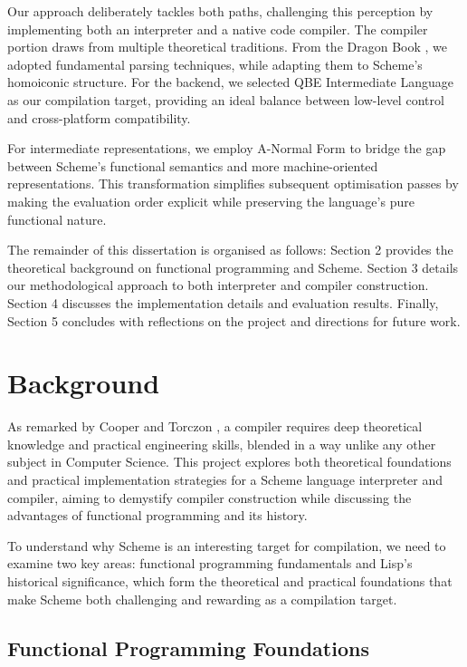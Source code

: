 \documentclass[final]{cmpreport_02}
\begin{document}
Our approach deliberately tackles both paths, challenging this perception by implementing both an interpreter and a native code compiler. The compiler portion draws from multiple theoretical traditions. From the Dragon Book \cite{aho2006compilers}, we adopted fundamental parsing techniques, while adapting them to Scheme's homoiconic structure. For the backend, we selected QBE Intermediate Language \cite{qbe_il} as our compilation target, providing an ideal balance between low-level control and cross-platform compatibility.

For intermediate representations, we employ A-Normal Form \cite{flanagan1993essence} to bridge the gap between Scheme's functional semantics and more machine-oriented representations. This transformation simplifies subsequent optimisation passes by making the evaluation order explicit while preserving the language's pure functional nature.

The remainder of this dissertation is organised as follows: Section 2 provides the theoretical background on functional programming and Scheme. Section 3 details our methodological approach to both interpreter and compiler construction. Section 4 discusses the implementation details and evaluation results. Finally, Section 5 concludes with reflections on the project and directions for future work.

\section{Background}

As remarked by Cooper and Torczon \cite{cooper2011engineering}, a compiler requires deep theoretical knowledge and practical engineering skills, blended in a way unlike any other subject in Computer Science. This project explores both theoretical foundations and practical implementation strategies for a Scheme language interpreter and compiler, aiming to demystify compiler construction while discussing the advantages of functional programming and its history.

To understand why Scheme is an interesting target for compilation, we need to examine two key areas: functional programming fundamentals and Lisp's historical significance, which form the theoretical and practical foundations that make Scheme both challenging and rewarding as a compilation target.

\subsection{Functional Programming Foundations}
\end{document}
